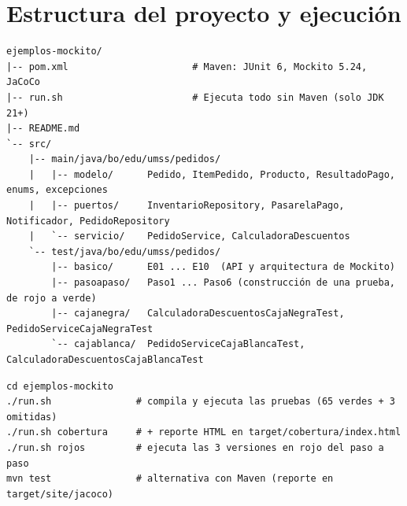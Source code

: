 \documentclass[11pt,a4paper,oneside]{report}
\newcommand{\code}[1]{\texttt{#1}}
\begin{document}
\chapter{Estructura del proyecto y ejecución}
\begin{lstlisting}[style=bash,caption={Estructura de \code{ejemplos-mockito/}}]
ejemplos-mockito/
|-- pom.xml                      # Maven: JUnit 6, Mockito 5.24, JaCoCo
|-- run.sh                       # Ejecuta todo sin Maven (solo JDK 21+)
|-- README.md
`-- src/
    |-- main/java/bo/edu/umss/pedidos/
    |   |-- modelo/      Pedido, ItemPedido, Producto, ResultadoPago, enums, excepciones
    |   |-- puertos/     InventarioRepository, PasarelaPago, Notificador, PedidoRepository
    |   `-- servicio/    PedidoService, CalculadoraDescuentos
    `-- test/java/bo/edu/umss/pedidos/
        |-- basico/      E01 ... E10  (API y arquitectura de Mockito)
        |-- pasoapaso/   Paso1 ... Paso6 (construcción de una prueba, de rojo a verde)
        |-- cajanegra/   CalculadoraDescuentosCajaNegraTest, PedidoServiceCajaNegraTest
        `-- cajablanca/  PedidoServiceCajaBlancaTest, CalculadoraDescuentosCajaBlancaTest
\end{lstlisting}

\begin{lstlisting}[style=bash,caption={Comandos de ejecución}]
cd ejemplos-mockito
./run.sh               # compila y ejecuta las pruebas (65 verdes + 3 omitidas)
./run.sh cobertura     # + reporte HTML en target/cobertura/index.html
./run.sh rojos         # ejecuta las 3 versiones en rojo del paso a paso
mvn test               # alternativa con Maven (reporte en target/site/jacoco)
\end{lstlisting}
\end{document}
